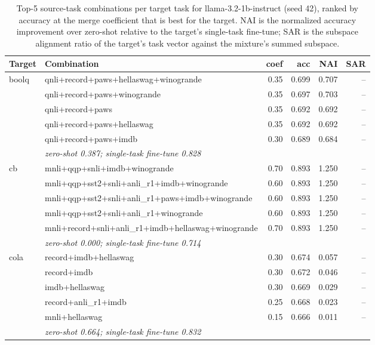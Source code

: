 \begin{table}[t]
  \centering
  \caption{Top-5 source-task combinations per target task for llama-3.2-1b-instruct (seed 42), ranked by accuracy at the merge coefficient that is best for the target. NAI is the normalized accuracy improvement over zero-shot relative to the target's single-task fine-tune; SAR is the subspace alignment ratio of the target's task vector against the mixture's summed subspace.}
  \label{tab:target-transfer}
  \begin{tabular}{llrrrr}
    \toprule
    Target & Combination & coef & acc & NAI & SAR \\
    \midrule
    boolq & qnli+record+paws+hellaswag+winogrande & 0.35 & 0.699 & 0.707 & -- \\
     & qnli+record+paws+winogrande & 0.35 & 0.697 & 0.703 & -- \\
     & qnli+record+paws & 0.35 & 0.692 & 0.692 & -- \\
     & qnli+record+paws+hellaswag & 0.35 & 0.692 & 0.692 & -- \\
     & qnli+record+paws+imdb & 0.30 & 0.689 & 0.684 & -- \\
    & \multicolumn{5}{l}{\textit{zero-shot 0.387; single-task fine-tune 0.828}} \\
    \addlinespace
    cb & mnli+qqp+snli+imdb+winogrande & 0.70 & 0.893 & 1.250 & -- \\
     & mnli+qqp+sst2+snli+anli\_r1+imdb+winogrande & 0.60 & 0.893 & 1.250 & -- \\
     & mnli+qqp+sst2+snli+anli\_r1+paws+imdb+winogrande & 0.60 & 0.893 & 1.250 & -- \\
     & mnli+qqp+sst2+snli+anli\_r1+winogrande & 0.60 & 0.893 & 1.250 & -- \\
     & mnli+record+snli+anli\_r1+imdb+hellaswag+winogrande & 0.70 & 0.893 & 1.250 & -- \\
    & \multicolumn{5}{l}{\textit{zero-shot 0.000; single-task fine-tune 0.714}} \\
    \addlinespace
    cola & record+imdb+hellaswag & 0.30 & 0.674 & 0.057 & -- \\
     & record+imdb & 0.30 & 0.672 & 0.046 & -- \\
     & imdb+hellaswag & 0.30 & 0.669 & 0.029 & -- \\
     & record+anli\_r1+imdb & 0.25 & 0.668 & 0.023 & -- \\
     & mnli+hellaswag & 0.15 & 0.666 & 0.011 & -- \\
    & \multicolumn{5}{l}{\textit{zero-shot 0.664; single-task fine-tune 0.832}} \\

\end{tabular}
\end{table}

